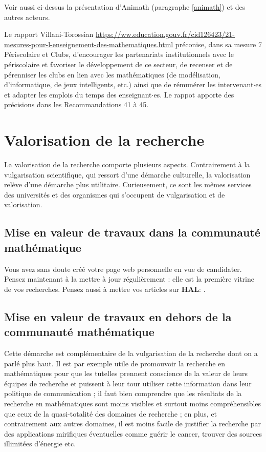 Voir aussi ci-dessus la pr\'esentation d'Animath (paragraphe \ref{animath}) et des autres acteurs. 

Le rapport Villani-Torossian \url{https://ww.education.gouv.fr/cid126423/21-mesures-pour-l-enseignement-des-mathematiques.html} pr\'econise, dans sa mesure 7 P\'eriscolaire et Clubs,	d'encourager les partenariats institutionnels avec le p\'eriscolaire et favoriser le d\'eveloppement de ce secteur, de recenser et de p\'erenniser les clubs en lien avec les math\'ematiques (de mod\'elisation, d’informatique, de jeux intelligents, etc.) ainsi que de r\'emun\'erer les intervenant$\cdot$es et adapter les emplois du temps des enseignant$\cdot$es. Le rappot apporte des pr\'ecisions dans les Recommandations 41 \`a 45.



\section{Valorisation de la recherche}

La valorisation de la recherche comporte plusieurs aspects. Contrairement \`a la vulgarisation scientifique,
qui ressort d'une d\'emarche culturelle, la valorisation rel\`eve d'une d\'emarche plus utilitaire. Curieusement,
ce sont les m\^emes services des universit\'es et des organismes qui s'occupent de vulgarisation et de valorisation.

\subsection{Mise en valeur de travaux dans la communaut\'e math\'ematique}
Vous avez sans doute cr\'e\'e votre page web personnelle en vue de candidater.
Pensez maintenant \`a la mettre \`a jour r\'eguli\`erement : elle est la premi\`ere vitrine de vos recherches.
Pensez aussi \`a mettre vos articles sur \textbf{HAL}: .

\subsection{Mise en valeur de travaux en dehors de la communaut\'e math\'ematique}
Cette d\'emarche est compl\'ementaire de la vulgarisation de la recherche dont on a parl\'e plus haut.
Il est par exemple utile de promouvoir la recherche
en math\'ematiques pour que les tutelles prennent conscience de la valeur de leurs \'equipes de recherche
et puissent \`a leur tour utiliser cette information dans leur politique de communication ; il faut bien
comprendre que les r\'esultats de la recherche en math\'ematiques sont moins visibles et surtout moins
compr\'ehensibles que ceux de la quasi-totalit\'e des domaines de recherche ; en plus, et contrairement
 aux autres domaines, il est moins facile de justifier la recherche par des applications mirifiques \'eventuelles
comme gu\'erir le cancer, trouver des sources illimit\'ees d'\'energie etc.

